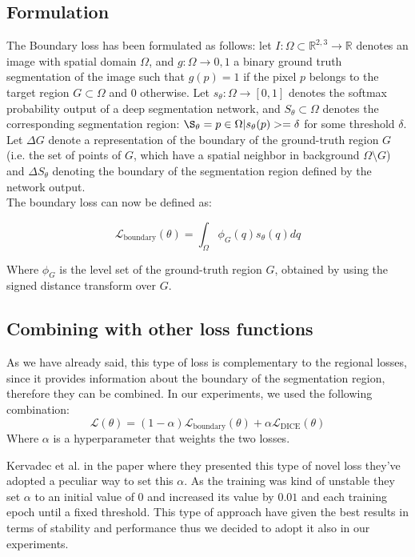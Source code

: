 \subsection{Formulation}
The Boundary loss has been formulated as follows: let $I: \Omega \subset
\mathbb{R}^{2,3} \rightarrow \mathbb{R}$ denotes an image with spatial domain
$\Omega$, and $g: \Omega \rightarrow {0,1}$ a binary ground truth segmentation
of the image such that $g(p) = 1$ if the pixel $p$ belongs to the target region
$G \subset \Omega$ and $0$ otherwise. Let $s_\theta : \Omega \rightarrow [0,1]$
denotes the softmax probability output of a deep segmentation network, and
$S_\theta \subset \Omega$ denotes the corresponding segmentation region:
$\S_\theta = {p \in \Omega | s_\theta(p) >= \delta}$ for some threshold
$\delta$. Let $\Delta G$ denote a representation of the boundary of the
ground-truth region $G$ (i.e. the set of points of $G$, which have a spatial
neighbor in background $\Omega \setminus G$) and $\Delta S_\theta$ denoting the
boundary of the segmentation region defined by the network output.\\
The boundary loss can now be defined as:

\begin{equation}
  \label{eq:boundaryloss}
  \mathcal{L}_{\text{boundary}}(\theta) = \int_{\Omega} \phi_G(q)s_\theta(q)dq
\end{equation}

Where $\phi_G$ is the level set of the ground-truth region $G$, obtained by
using the signed distance transform over $G$.

\subsection{Combining with other loss functions}
As we have already said, this type of loss is complementary to the regional
losses, since it provides information about the boundary of the segmentation
region, therefore they can be combined. In our experiments, we used the
following combination:
\begin{equation}
  \label{eq:boundaryloss}
  \mathcal{L}(\theta) = (1-\alpha)\mathcal{L}_{\text{boundary}}(\theta) +
  \alpha\mathcal{L}_{\text{DICE}}(\theta)
\end{equation}
Where $\alpha$ is a hyperparameter that weights the two losses.

Kervadec et al. in the paper where they presented this type of novel loss
they've adopted a peculiar way to set this $\alpha$. As the training was kind of
unstable they set $\alpha$ to an initial value of $0$ and increased its value by
$0.01$ and each training epoch until a fixed threshold. This type of approach
have given the best results in terms of stability and performance thus we
decided to adopt it also in our experiments.

